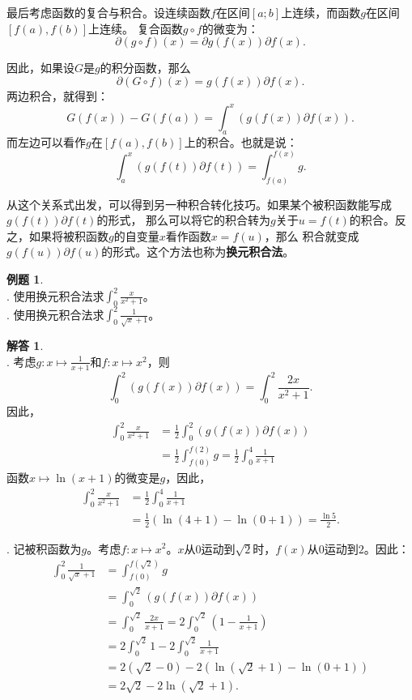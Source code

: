\documentclass[12pt,UTF8]{ctexbook}
\theoremstyle{definition}
\newtheorem{et}{例题}[section]
\newtheorem*{so}{解答}
\theoremstyle{plain}
\begin{document}
最后考虑函数的复合与积合。设连续函数$f$在区间$[a; b]$上连续，而函数$g$在区间$[f(a), f(b)]$上连续。
复合函数$g\circ f$的微变为：
$$ \partial (g \circ f) (x) = \partial g(f(x)) \partial f (x). $$

因此，如果设$G$是$g$的积分函数，那么
$$ \partial (G \circ f) (x) = g(f(x)) \partial f (x). $$
两边积合，就得到：
$$ G(f(x)) - G(f(a)) = \int_a^x \left( g(f(x)) \partial f (x) \right).$$
而左边可以看作$g$在$[f(a), f(b)]$上的积合。也就是说：
$$ \int_a^x \left( g(f(t)) \partial f (t) \right) = \int_{f(a)}^{f(x)} g.$$

从这个关系式出发，可以得到另一种积合转化技巧。如果某个被积函数能写成$g(f(t)) \partial f (t)$的形式，
那么可以将它的积合转为$g$关于$u = f(t)$的积合。反之，如果将被积函数$g$的自变量$x$看作函数$x = f(u)$，那么
积合就变成$g(f(u)) \partial f (u)$的形式。这个方法也称为\textbf{换元积合法}。

\begin{et}
    \mbox{} \\
    . 使用换元积合法求$\int_0^2 \frac{x}{x^2 + 1}$。 \\
    . 使用换元积合法求$\int_0^2 \frac{1}{\sqrt{x} + 1}$。
\end{et}

\begin{so}
    \mbox{} \\
    . 考虑$g: x\mapsto \frac{1}{x + 1}$和$f: x\mapsto x^2$，则
    $$ \int_0^2 \left( g(f(x)) \partial f (x) \right) = \int_0^2 \frac{2x}{x^2 + 1}. $$
    因此，
    \begin{align*}
        \int_0^2 \frac{x}{x^2 + 1} &= \frac{1}{2} \int_0^2 \left( g(f(x)) \partial f (x) \right) \\
        &= \frac{1}{2}\int_{f(0)}^{f(2)} g = \frac{1}{2}\int_0^4 \frac{1}{x + 1} 
    \end{align*}
    函数$x\mapsto \ln{(x + 1)}$的微变是$g$，因此，
    \begin{align*}
        \int_0^2 \frac{x}{x^2 + 1} &= \frac{1}{2}\int_0^4 \frac{1}{x + 1} \\
        &= \frac{1}{2}\left(\ln{(4 + 1)} - \ln{(0 + 1)}\right) = \frac{\ln{5}}{2}.
    \end{align*}

    . 记被积函数为$g$。考虑$f: x\mapsto x^2$。$x$从$0$运动到$\sqrt{2}$时，$f(x)$从$0$运动到$2$。因此：
    \begin{align*}
        \int_0^2 \frac{1}{\sqrt{x} + 1} &= \int_{f(0)}^{f(\sqrt{2})} g \\
        &= \int_0^{\sqrt{2}} \left( g(f(x)) \partial f (x) \right) \\
        &= \int_0^{\sqrt{2}} \frac{2x}{x + 1} = 2\int_0^{\sqrt{2}} \left( 1 - \frac{1}{x + 1} \right) \\
        &= 2\int_0^{\sqrt{2}} 1 - 2\int_0^{\sqrt{2}} \frac{1}{x + 1} \\
        &= 2(\sqrt{2} - 0) - 2 \left(\ln{(\sqrt{2} + 1)} - \ln{(0 + 1)}\right) \\
        &= 2\sqrt{2} - 2\ln{(\sqrt{2} + 1)}.
    \end{align*}
\end{so}
\end{document}
